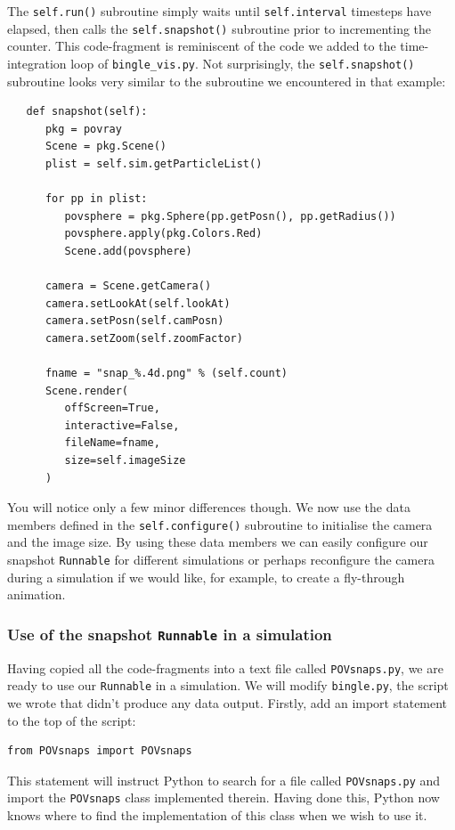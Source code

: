 The \texttt{self.run()} subroutine simply waits until \texttt{self.interval} timesteps have elapsed, then calls the \texttt{self.snapshot()} subroutine prior to incrementing the counter. This code-fragment is reminiscent of the code we added to the time-integration loop of \texttt{bin\+gle\_\+vis.py}. Not surprisingly, the \texttt{self.snapshot()} subroutine looks very similar to the subroutine we encountered in that example: 

\begin{verbatim}
   def snapshot(self):
      pkg = povray
      Scene = pkg.Scene()
      plist = self.sim.getParticleList()

      for pp in plist:
         povsphere = pkg.Sphere(pp.getPosn(), pp.getRadius())
         povsphere.apply(pkg.Colors.Red)
         Scene.add(povsphere)

      camera = Scene.getCamera()
      camera.setLookAt(self.lookAt)
      camera.setPosn(self.camPosn)
      camera.setZoom(self.zoomFactor)

      fname = "snap_%.4d.png" % (self.count)
      Scene.render(
         offScreen=True, 
         interactive=False, 
         fileName=fname, 
         size=self.imageSize
      )
\end{verbatim}

\noindent
You will notice only a few minor differences though. We now use the data members defined in the \texttt{self.configure()} subroutine to initialise the camera and the image size. By using these data members we can easily configure our snapshot \texttt{Runnable} for different simulations or perhaps reconfigure the camera during a simulation if we would like, for example, to create a fly-through animation.

\subsubsection{Use of the snapshot \texttt{Runnable} in a simulation}

Having copied all the code-fragments into a text file called \texttt{POVsnaps.py}, we are ready to use our \texttt{Runnable} in a simulation. We will modify \texttt{bingle.py}, the script we wrote that didn't produce any data output. Firstly, add an import statement to the top of the script:

\begin{verbatim} 
from POVsnaps import POVsnaps
\end{verbatim} 

\noindent
This statement will instruct Python to search for a file called \texttt{POVsnaps.py} and import the \texttt{POVsnaps} class implemented therein. Having done this, Python now knows where to find the implementation of this class when we wish to use it. 

